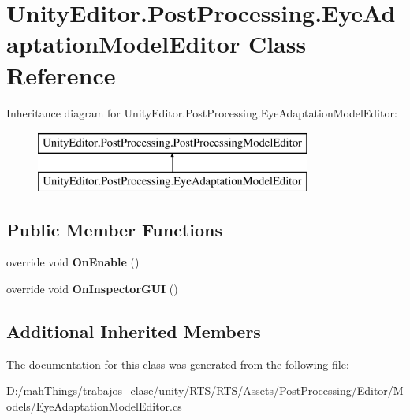 \hypertarget{class_unity_editor_1_1_post_processing_1_1_eye_adaptation_model_editor}{}\section{Unity\+Editor.\+Post\+Processing.\+Eye\+Adaptation\+Model\+Editor Class Reference}
\label{class_unity_editor_1_1_post_processing_1_1_eye_adaptation_model_editor}
Inheritance diagram for Unity\+Editor.\+Post\+Processing.\+Eye\+Adaptation\+Model\+Editor\+:\begin{figure}[H]
\begin{center}
\leavevmode
\includegraphics[height=2.000000cm]{class_unity_editor_1_1_post_processing_1_1_eye_adaptation_model_editor}
\end{center}
\end{figure}
\subsection*{Public Member Functions}
\begin{DoxyCompactItemize}
\item 
\mbox{\label{class_unity_editor_1_1_post_processing_1_1_eye_adaptation_model_editor_a9d480e9449494f870ac0ce711fce6091}} 
override void {\bfseries On\+Enable} ()
\item 
\mbox{\label{class_unity_editor_1_1_post_processing_1_1_eye_adaptation_model_editor_a4cf6a60dd7701b19aeda57e557f44cee}} 
override void {\bfseries On\+Inspector\+G\+UI} ()
\end{DoxyCompactItemize}
\subsection*{Additional Inherited Members}


The documentation for this class was generated from the following file\+:\begin{DoxyCompactItemize}
\item 
D\+:/mah\+Things/trabajos\+\_\+clase/unity/\+R\+T\+S/\+R\+T\+S/\+Assets/\+Post\+Processing/\+Editor/\+Models/Eye\+Adaptation\+Model\+Editor.\+cs\end{DoxyCompactItemize}
